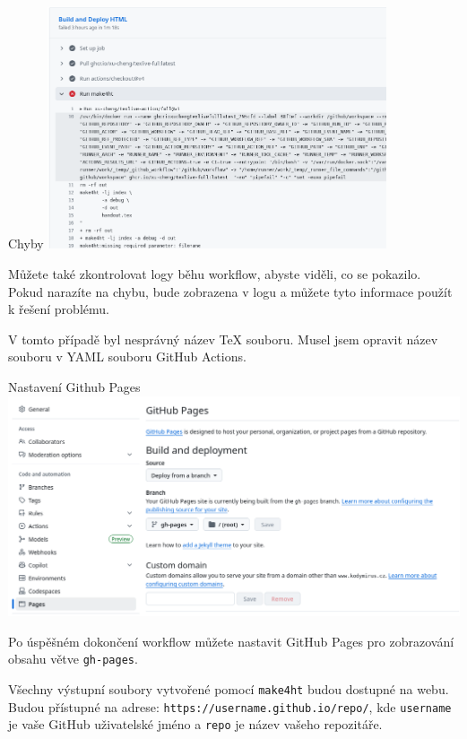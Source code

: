 \begin{frame}[fragile]{Chyby}
\includegraphics[width=0.75\textwidth]{img/github-error.png}
\end{frame}

Můžete také zkontrolovat logy běhu workflow, abyste viděli, co se pokazilo.
Pokud narazíte na chybu, bude zobrazena v logu a můžete tyto informace
použít k řešení problému.

V tomto případě byl nesprávný název TeX souboru. Musel jsem opravit název
souboru v YAML souboru GitHub Actions.


\begin{frame}[fragile]{Nastavení Github Pages}
\includegraphics[width=\textwidth]{img/github-pages.png}
\end{frame}

Po úspěšném dokončení workflow můžete nastavit GitHub Pages pro zobrazování obsahu větve \texttt{gh-pages}.

Všechny výstupní soubory vytvořené pomocí \texttt{make4ht} budou dostupné na webu.
Budou přístupné na adrese:
\verb|https://username.github.io/repo/|,
kde \texttt{username} je vaše GitHub uživatelské jméno a \texttt{repo} je název vašeho repozitáře.


